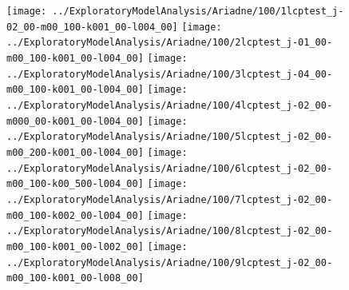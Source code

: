 \documentclass[12pt,a4paper]{thesis}
\begin{document}
\begin{figure}
\centering
\texttt{[image: ../ExploratoryModelAnalysis/Ariadne/100/1lcptest\_j-02\_00-m00\_100-k001\_00-l004\_00]}
\texttt{[image: ../ExploratoryModelAnalysis/Ariadne/100/2lcptest\_j-01\_00-m00\_100-k001\_00-l004\_00]}
\texttt{[image: ../ExploratoryModelAnalysis/Ariadne/100/3lcptest\_j-04\_00-m00\_100-k001\_00-l004\_00]}
\texttt{[image: ../ExploratoryModelAnalysis/Ariadne/100/4lcptest\_j-02\_00-m000\_00-k001\_00-l004\_00]}
\texttt{[image: ../ExploratoryModelAnalysis/Ariadne/100/5lcptest\_j-02\_00-m00\_200-k001\_00-l004\_00]}
\texttt{[image: ../ExploratoryModelAnalysis/Ariadne/100/6lcptest\_j-02\_00-m00\_100-k00\_500-l004\_00]}
\texttt{[image: ../ExploratoryModelAnalysis/Ariadne/100/7lcptest\_j-02\_00-m00\_100-k002\_00-l004\_00]}
\texttt{[image: ../ExploratoryModelAnalysis/Ariadne/100/8lcptest\_j-02\_00-m00\_100-k001\_00-l002\_00]}
\texttt{[image: ../ExploratoryModelAnalysis/Ariadne/100/9lcptest\_j-02\_00-m00\_100-k001\_00-l008\_00]}
\caption{}
\label{fig:100kmAll}
\end{figure}
\end{document}
